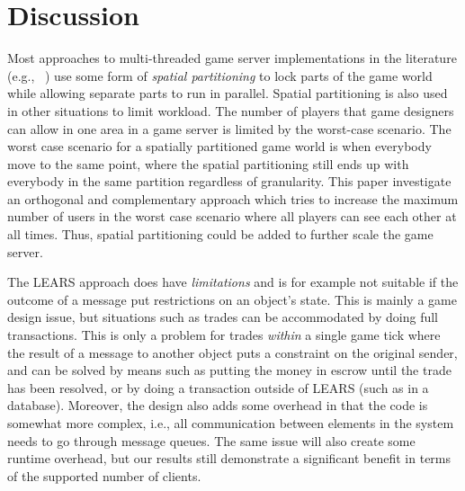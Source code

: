 \section{Discussion}
\label{sec:disc}


Most approaches to multi-threaded game server implementations in the
literature (e.g., ~\cite{Abdelkhalek2004++}) use some form of
\textit{spatial partitioning} to lock parts of the game world while
allowing separate parts to run in parallel. Spatial partitioning is
also used in other situations to limit workload. The number of players
that game designers can allow in one area in a game server is limited
by the worst-case scenario. The worst case scenario for a spatially
partitioned game world is when everybody move to the same point, where
the spatial partitioning still ends up with everybody in the same
partition regardless of granularity.  This paper investigate an
orthogonal and complementary approach which tries to increase the
maximum number of users in the worst case scenario where all players
can see each other at all times. Thus, spatial partitioning could be
added to further scale the game server.





The LEARS approach does have \textit{limitations} and is for example not
suitable if the outcome of a message put restrictions on an object's
state. This is mainly a game design issue, but situations such as
trades can be accommodated by doing full transactions. 
This is only a problem for trades \textit{within} a single game tick
where the result of a message to another object puts a constraint on
the original sender, and can be solved by means such as putting the
money in escrow until the trade has been resolved, or by doing a
transaction outside of LEARS (such as in a database).
%
Moreover, the design also adds some overhead in that the code is
somewhat more complex, i.e., all communication between elements in the
system needs to go through message queues. The same issue will also
create some runtime overhead, but our results still demonstrate a
significant benefit in terms of the supported number of clients.

